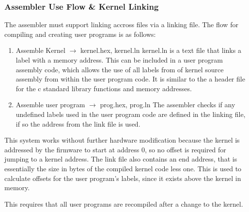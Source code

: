 \documentclass[../ProjectDocumentation.tex]{subfiles}
\begin{document}
\subsubsection{Assembler Use Flow \& Kernel Linking}
The assembler must support linking accross files via a linking file. The flow for compiling and creating user programs is as follows:
\begin{enumerate}
\item Assemble Kernel $\rightarrow$ kernel.hex, kernel.ln
\subitem kernel.ln is a text file that links a label with a memory address. This can be included in a user program assembly code, which allows the use of all labels from of kernel source assembly from within the user program code. It is similar to the a header file for the c standard library functions and memory addresses.
\item Assemble user program $\rightarrow$ prog.hex, prog.ln
\subitem The assembler checks if any undefined labels used in the user program code are defined in the linking file, if so the address from the link file is used.
\end{enumerate}
This system works without further hardware modification because the kernel is addressed by the firmware to start at address 0, so no offset is required for jumping to a kernel address. The link file also contains an end address, that is essentially the size in bytes of the compiled kernel code less one. This is used to calculate offsets for the user program's labels, since it exists above the kernel in memory.

This requires that all user programs are recompiled after a change to the kernel.
\end{document}

